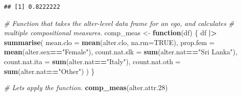 \documentclass[
]{book}
\newenvironment{Shaded}{\begin{snugshade}}{\end{snugshade}}
\newcommand{\AttributeTok}[1]{\textcolor[rgb]{0.13,0.29,0.53}{#1}}
\newcommand{\CommentTok}[1]{\textcolor[rgb]{0.56,0.35,0.01}{\textit{#1}}}
\newcommand{\ConstantTok}[1]{\textcolor[rgb]{0.56,0.35,0.01}{#1}}
\newcommand{\ControlFlowTok}[1]{\textcolor[rgb]{0.13,0.29,0.53}{\textbf{#1}}}
\newcommand{\FloatTok}[1]{\textcolor[rgb]{0.00,0.00,0.81}{#1}}
\newcommand{\FunctionTok}[1]{\textcolor[rgb]{0.13,0.29,0.53}{\textbf{#1}}}
\newcommand{\NormalTok}[1]{#1}
\newcommand{\OtherTok}[1]{\textcolor[rgb]{0.56,0.35,0.01}{#1}}
\newcommand{\SpecialCharTok}[1]{\textcolor[rgb]{0.81,0.36,0.00}{\textbf{#1}}}
\newcommand{\StringTok}[1]{\textcolor[rgb]{0.31,0.60,0.02}{#1}}
\begin{document}
\begin{Shaded}
\end{Shaded}

\begin{verbatim}
## [1] 0.8222222
\end{verbatim}

\begin{Shaded}
\begin{Highlighting}[]
\CommentTok{\# Function that takes the alter{-}level data frame for an ego, and calculates}
\CommentTok{\# multiple compositional measures.}
\NormalTok{comp\_meas }\OtherTok{\textless{}{-}} \ControlFlowTok{function}\NormalTok{(df) \{}
\NormalTok{  df }\SpecialCharTok{|\textgreater{}}
    \FunctionTok{summarise}\NormalTok{(}
      \AttributeTok{mean.clo =} \FunctionTok{mean}\NormalTok{(alter.clo, }\AttributeTok{na.rm=}\ConstantTok{TRUE}\NormalTok{), }
      \AttributeTok{prop.fem =} \FunctionTok{mean}\NormalTok{(alter.sex}\SpecialCharTok{==}\StringTok{"Female"}\NormalTok{), }
      \AttributeTok{count.nat.slk =} \FunctionTok{sum}\NormalTok{(alter.nat}\SpecialCharTok{==}\StringTok{"Sri Lanka"}\NormalTok{), }
      \AttributeTok{count.nat.ita =} \FunctionTok{sum}\NormalTok{(alter.nat}\SpecialCharTok{==}\StringTok{"Italy"}\NormalTok{), }
      \AttributeTok{count.nat.oth =} \FunctionTok{sum}\NormalTok{(alter.nat}\SpecialCharTok{==}\StringTok{"Other"}\NormalTok{)}
\NormalTok{    )}
\NormalTok{\}}

\CommentTok{\# Let\textquotesingle{}s apply the function.}
\FunctionTok{comp\_meas}\NormalTok{(alter.attr}\FloatTok{.28}\NormalTok{)}
\end{Highlighting}
\end{Shaded}
\end{document}
